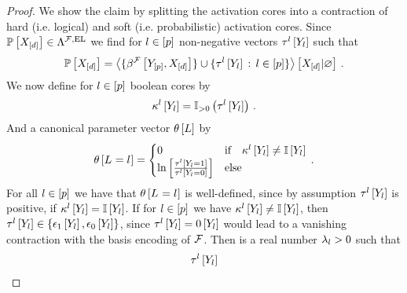 \begin{proof}
    We show the claim by splitting the activation cores into a contraction of hard (i.e. logical) and soft (i.e. probabilistic) activation cores.
    Since $\mathbb{P}\left[X_{[d]}\right]\in\Lambda^{\mathcal{F},\mathrm{EL}}$ we find for $l\in[p]$ non-negative vectors $\tau^{l}\left[Y_{l}\right]$ such that
    \begin{align*}
        \mathbb{P}\left[X_{[d]}\right] =
        \left\langle 
            \{\beta^{\mathcal{F}}\left[Y_{[p]},X_{[d]}\right]\}
            \cup \{\tau^{l}\left[Y_{l}\right]\,:\,l\in[p]\}
        \right\rangle \left[ X_{[d]} | \varnothing \right] \, .
    \end{align*}
    We now define for $l\in[p]$ boolean cores by
    \begin{align*}
        \kappa^{l}\left[Y_{l}\right] =
        \mathbb{I}_{>0}\left(\tau^{l}\left[Y_{l}\right]\right) \, .
    \end{align*}
    And a canonical parameter vector $\theta\left[L\right]$ by
    \begin{align*}
        \theta\left[L_{}=l_{}\right] =
        \begin{cases}
            0 & \text{if} \quad \kappa^{l}\left[Y_{l}\right]\neq\mathbb{I}\left[Y_{l}\right] \\
            \ln \left[ \frac{\tau^{l}\left[Y_{l}=1\right]}{\tau^{l}\left[Y_{l}=0\right]} \right] & \text{else} \\
        \end{cases} \, .
    \end{align*}
    For all $l\in[p]$ we have that $\theta\left[L_{}=l_{}\right]$ is well-defined, since by assumption $\tau^{l}\left[Y_{l}\right]$ is positive, if $\kappa^{l}\left[Y_{l}\right]=\mathbb{I}\left[Y_{l}\right]$.
    If for $l\in[p]$ we have $\kappa^{l}\left[Y_{l}\right]\neq\mathbb{I}\left[Y_{l}\right]$, then $\tau^{l}\left[Y_{l}\right]\in\{\epsilon_1\left[Y_{l}\right],\epsilon_0\left[Y_{l}\right]\}$, since $\tau^{l}\left[Y_{l}\right]=0\left[Y_{l}\right]$ would lead to a vanishing contraction with the basis encoding of $\mathcal{F}$.
    Then is a real number $\lambda_{l}>0$ such that
    \begin{align*}
        \hypercoreofat{\selindex}{\headvariableof{\selindex}}

\end{align*}
\end{proof}
